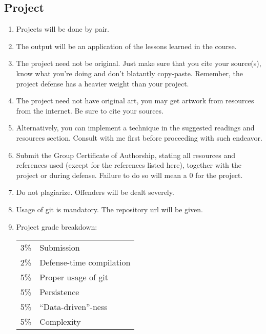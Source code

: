 \documentclass[10pt]{article}
\begin{document}
\subsection{Project}
\begin{enumerate}[noitemsep]
\item Projects will be done by pair.
\item The output will be an application of the lessons learned in the course.
\item The project need not be original. Just make sure that you cite your source(s), know what you're doing and don't blatantly copy-paste. Remember, the project defense has a heavier weight than your project.
\item The project need not have original art, you may get artwork from resources from the internet. Be sure to cite your sources.
\item Alternatively, you can implement a technique in the suggested readings and resources section. Consult with me first before proceeding with such endeavor. 
\item Submit the Group Certificate of Authorship, stating all resources and references used (except for the references listed here), together with the project or during defense. Failure to do so will mean a 0 for the project.
\item Do not plagiarize. Offenders will be dealt severely.
\item Usage of git is mandatory. The repository url will be given.
\item Project grade breakdown:
\begin{center}
\begin{tabular}{rl}
3\% & Submission\\
2\% & Defense-time compilation\\
5\% & Proper usage of git\\
5\% & Persistence\\
5\% & ``Data-driven''-ness\\
5\% & Complexity\\
\end{tabular}
\end{center}
\end{enumerate}
\end{document}
